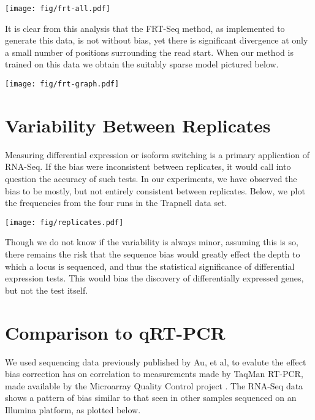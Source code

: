 \documentclass[letterpaper]{article}
\begin{document}
\begin{center}
\texttt{[image: fig/frt-all.pdf]}
\end{center}

It is clear from this analysis that the FRT-Seq method, as implemented to
generate this data, is not without bias, yet there is significant divergence at
only a small number of positions surrounding the read start. When our method is
trained on this data we obtain the suitably sparse model pictured below.

\begin{center}
\texttt{[image: fig/frt-graph.pdf]}
\end{center}



\section{Variability Between Replicates}

Measuring differential expression or isoform switching is a primary application of
RNA-Seq. If the bias were inconsistent between replicates, it would call into
question the accuracy of such tests. In our experiments, we have observed the
bias to be mostly, but not entirely consistent between replicates. Below, we
plot the frequencies from the four runs in the Trapnell data set.

\begin{center}
\texttt{[image: fig/replicates.pdf]}
\end{center}

Though we do not know if the variability is always minor, assuming this is so,
there remains the risk that the sequence bias would greatly effect the depth to
which a locus is sequenced, and thus the statistical significance of
differential expression tests. This would bias the discovery of differentially
expressed genes, but not the test itself.



\section{Comparison to qRT-PCR}

We used sequencing data previously published by Au, et al, \cite{Au2010} to
evalute the effect bias correction has on correlation to measurements made by
TaqMan RT-PCR, made available by the Microarray Quality Control project
\cite{Shi2006}. The RNA-Seq data shows a pattern of bias similar to that seen in
other samples sequenced on an Illumina platform, as plotted below.
\end{document}
